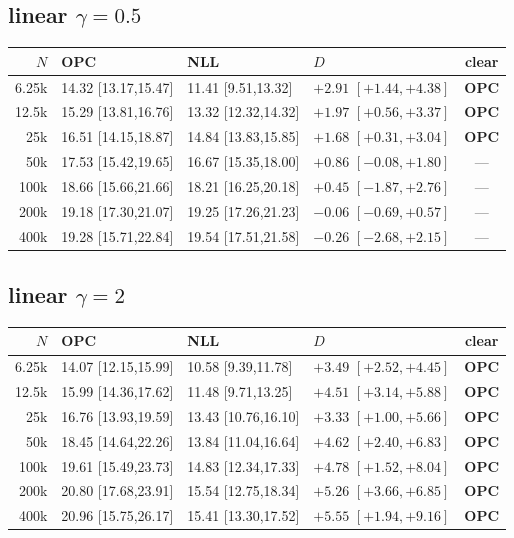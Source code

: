 \documentclass[10pt]{article}
\begin{document}
\subsection*{linear $\gamma{=}0.5$}
{\scriptsize
\begin{tabular}{@{}r lll c@{}}
\toprule
$N$ & OPC & NLL & $D$ & clear \\
\midrule
6.25k & 14.32 [13.17,15.47] & 11.41 [9.51,13.32] & $+2.91$ $[+1.44,+4.38]$ & \textbf{OPC} \\
12.5k & 15.29 [13.81,16.76] & 13.32 [12.32,14.32] & $+1.97$ $[+0.56,+3.37]$ & \textbf{OPC} \\
25k & 16.51 [14.15,18.87] & 14.84 [13.83,15.85] & $+1.68$ $[+0.31,+3.04]$ & \textbf{OPC} \\
50k & 17.53 [15.42,19.65] & 16.67 [15.35,18.00] & $+0.86$ $[-0.08,+1.80]$ & — \\
100k & 18.66 [15.66,21.66] & 18.21 [16.25,20.18] & $+0.45$ $[-1.87,+2.76]$ & — \\
200k & 19.18 [17.30,21.07] & 19.25 [17.26,21.23] & $-0.06$ $[-0.69,+0.57]$ & — \\
400k & 19.28 [15.71,22.84] & 19.54 [17.51,21.58] & $-0.26$ $[-2.68,+2.15]$ & — \\
\bottomrule
\end{tabular}}

\subsection*{linear $\gamma{=}2$}
{\scriptsize
\begin{tabular}{@{}r lll c@{}}
\toprule
$N$ & OPC & NLL & $D$ & clear \\
\midrule
6.25k & 14.07 [12.15,15.99] & 10.58 [9.39,11.78] & $+3.49$ $[+2.52,+4.45]$ & \textbf{OPC} \\
12.5k & 15.99 [14.36,17.62] & 11.48 [9.71,13.25] & $+4.51$ $[+3.14,+5.88]$ & \textbf{OPC} \\
25k & 16.76 [13.93,19.59] & 13.43 [10.76,16.10] & $+3.33$ $[+1.00,+5.66]$ & \textbf{OPC} \\
50k & 18.45 [14.64,22.26] & 13.84 [11.04,16.64] & $+4.62$ $[+2.40,+6.83]$ & \textbf{OPC} \\
100k & 19.61 [15.49,23.73] & 14.83 [12.34,17.33] & $+4.78$ $[+1.52,+8.04]$ & \textbf{OPC} \\
200k & 20.80 [17.68,23.91] & 15.54 [12.75,18.34] & $+5.26$ $[+3.66,+6.85]$ & \textbf{OPC} \\
400k & 20.96 [15.75,26.17] & 15.41 [13.30,17.52] & $+5.55$ $[+1.94,+9.16]$ & \textbf{OPC} \\
\bottomrule
\end{tabular}}
\end{document}
